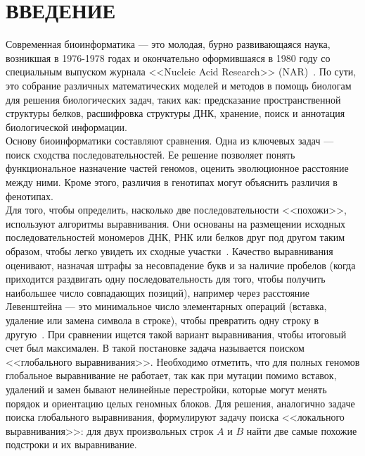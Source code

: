 \newpage
\part*{\large \centering ВВЕДЕНИЕ}
\hspace{\parindent} Современная биоинформатика --- это молодая, бурно развивающаяся наука, возникшая в 1976-1978 годах и окончательно оформившаяся в 1980 году со специальным выпуском журнала <<Nucleic Acid Research>> (NAR)~\cite{MironovLect}. По сути, это собрание различных математических моделей и методов в помощь биологам для решения биологических задач, таких как: предсказание пространственной структуры белков, расшифровка структуры ДНК, хранение, поиск и аннотация биологической информации.\\
\indent Основу биоинформатики составляют сравнения. Одна из ключевых задач --- поиск сходства последовательностей. Ее решение позволяет понять функциональное назначение частей геномов, оценить эволюционное расстояние между ними. Кроме этого, различия в генотипах могут объяснить различия в фенотипах.\\
\indent Для того, чтобы определить, насколько две последовательности <<похожи>>, используют алгоритмы выравнивания. Они основаны на размещении исходных последовательностей мономеров ДНК, РНК или белков друг под другом таким образом, чтобы легко увидеть их сходные участки~\cite{WikiPairAlign}. Качество выравнивания оценивают, назначая штрафы за несовпадение букв и за наличие пробелов (когда приходится раздвигать одну последовательность для того, чтобы получить наибольшее число совпадающих позиций), например через расстояние Левенштейна --- это минимальное число элементарных операций (вставка, удаление или замена символа в строке), чтобы превратить одну строку в другую~\cite{Levenshtein}. При сравнении ищется такой вариант выравнивания, чтобы итоговый счет был максимален. В такой постановке задача называется поиском <<глобального выравнивания>>. Необходимо отметить, что для полных геномов глобальное выравнивание не работает, так как при мутации помимо вставок, удалений и замен бывают нелинейные перестройки, которые могут менять порядок и ориентацию целых геномных блоков. Для решения, аналогично задаче поиска глобального выравнивания, формулируют задачу поиска <<локального выравнивания>>: для двух произвольных строк $A$ и $B$ найти две самые похожие подстроки и их выравнивание.\\ 
